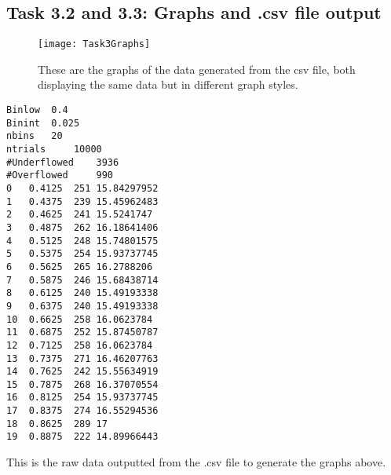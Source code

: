 \documentclass{article}
\begin{document}
\subsection{Task 3.2 and 3.3: Graphs and .csv file output}
\begin{figure}
\begin{center}
\texttt{[image: Task3Graphs]}
\caption{These are the graphs of the data generated from the csv file, both displaying the same data but in different graph styles.}
\end{center}
\end{figure}
\newpage	
\begin{lstlisting}
Binlow 	0.4		
Binint 	0.025		
nbins  	20		
ntrials  	10000		
#Underflowed  	3936		
#Overflowed  	990		
0	0.4125	251	15.84297952
1	0.4375	239	15.45962483
2	0.4625	241	15.5241747
3	0.4875	262	16.18641406
4	0.5125	248	15.74801575
5	0.5375	254	15.93737745
6	0.5625	265	16.2788206
7	0.5875	246	15.68438714
8	0.6125	240	15.49193338
9	0.6375	240	15.49193338
10	0.6625	258	16.0623784
11	0.6875	252	15.87450787
12	0.7125	258	16.0623784
13	0.7375	271	16.46207763
14	0.7625	242	15.55634919
15	0.7875	268	16.37070554
16	0.8125	254	15.93737745
17	0.8375	274	16.55294536
18	0.8625	289	17
19	0.8875	222	14.89966443
\end{lstlisting}
This is the raw data outputted from the .csv file to generate the graphs above.
\end{document}
